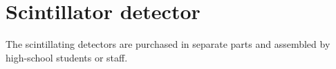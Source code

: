 \chapter{Scintillator detector}

The scintillating detectors are purchased in separate parts and assembled by
high-school students or staff.






